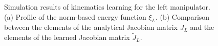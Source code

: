 \documentclass[journal,twoside,web]{ieeecolor}
\begin{document}
\begin{figure}[!t]
    \centering
    \hfill
    \caption{Simulation results of kinematics learning for the left manipulator. (a) Profile of the norm-based energy function $\xi_L$. (b) Comparison between the elements of the analytical Jacobian matrix $J_L$ and the elements of the learned Jacobian matrix $\tilde{J}_L$.
    }
    \label{figures:simulation:Jacobian}
\end{figure}
\end{document}
